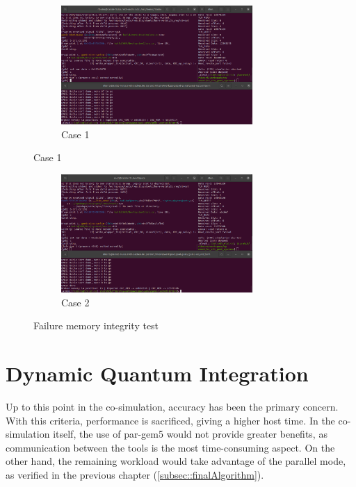 \begin{figure}[!b]

	\centering
	\begin{subfigure}{\textwidth}
		\centering
		\includegraphics[width=0.8\textwidth]{Images/Failure_MemoryIntegrity1.png}
		\caption{Case 1}
	\end{subfigure}
\end{figure}
\begin{figure}[ht] \ContinuedFloat
	\begin{subfigure}{\textwidth}
		\centering
		\includegraphics[width=0.8\textwidth]{Images/Failure_MemoryIntegrity2.png}
		\caption{Case 2}
	\end{subfigure}

	\caption{Failure memory integrity test}
	\label{fig_Failure_MemoryIntegrity}
\end{figure}


\section{Dynamic Quantum Integration}

Up to this point in the co-simulation, accuracy has been the primary concern. With this criteria, performance is sacrificed, giving a higher
host time. In the co-simulation itself, the use of par-gem5 would not provide greater benefits, as communication between the tools 
is the most time-consuming aspect. On the other hand, the remaining workload would take advantage of the parallel mode, as verified in the 
previous chapter (\ref{subsec::finalAlgorithm}). 

